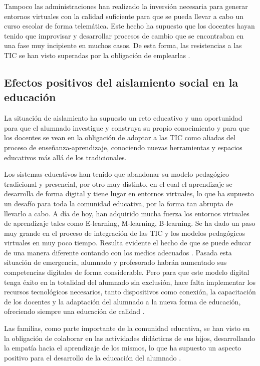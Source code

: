 \documentclass{textolivre}
\begin{document}
Tampoco las administraciones han realizado la inversión necesaria para generar entornos virtuales con la calidad suficiente para que se pueda llevar a cabo un curso escolar de forma telemática. Este hecho ha supuesto que los docentes hayan tenido que improvisar y desarrollar procesos de cambio que se encontraban en una fase muy incipiente en muchos casos. De esta forma, las resistencias a las TIC se han visto superadas por la obligación de emplearlas \cite{martinezlopez2020}.

\subsection{Efectos positivos del aislamiento social en la educación}
La situación de aislamiento ha supuesto un reto educativo y una oportunidad para que el alumnado investigue y construya su propio conocimiento \cite{ceballosmaron2020} y para que los docentes se vean en la obligación de adoptar a las TIC como aliadas del proceso de enseñanza-aprendizaje, conociendo nuevas herramientas y espacios educativos más allá de los tradicionales.

Los sistemas educativos han tenido que abandonar su modelo pedagógico tradicional y presencial, por otro muy distinto, en el cual el aprendizaje se desarrolla de forma digital y tiene lugar en entornos virtuales, lo que ha supuesto un desafío para toda la comunidad educativa, por la forma tan abrupta de llevarlo a cabo. A día de hoy, han adquirido mucha fuerza los entornos virtuales de aprendizaje tales como E-learning, M-learning, B-learning. Se ha dado un paso muy grande en el proceso de integración de las TIC y los modelos pedagógicos virtuales en muy poco tiempo. Resulta evidente el hecho de que se puede educar de una manera diferente contando con los medios adecuados \cite{moraaristega2021}. Pasada esta situación de emergencia, alumnado y profesorado habrán aumentado sus competencias digitales de forma considerable. Pero para que este modelo digital tenga éxito en la totalidad del alumnado sin exclusión, hace falta implementar los recursos tecnológicos necesarios, tanto dispositivos como conexión, la capacitación de los docentes y la adaptación del alumnado a la nueva forma de educación, ofreciendo siempre una educación de calidad \cite{condor-herrera2020}.

Las familias, como parte importante de la comunidad educativa, se han visto en la obligación de colaborar en las actividades didácticas de sus hijos, desarrollando la empatía hacia el aprendizaje de los mismos, lo que ha supuesto un aspecto positivo para el desarrollo de la educación del alumnado \cite{moraaristega2021}.
\end{document}
